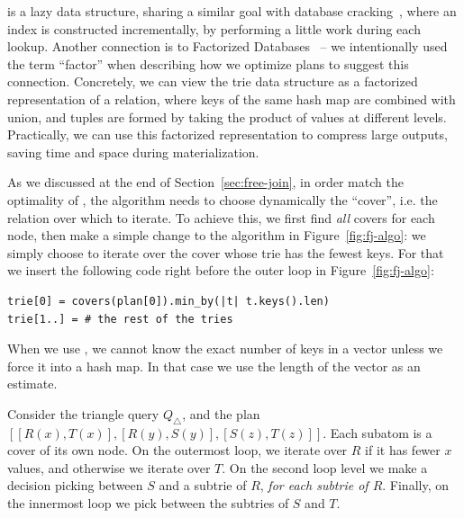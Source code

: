 \COLT is a lazy data structure, sharing a similar goal with database
cracking~\cite{DBLP:conf/cidr/IdreosKM07,DBLP:conf/sigmod/IdreosKM07}, where an
index is constructed incrementally, by performing a little work during each
lookup. 
Another connection is to Factorized Databases~\cite{DBLP:journals/sigmod/OlteanuS16} -- we
intentionally used the term ``factor'' when describing how we optimize \FJ plans to
suggest this connection. 
Concretely, we can view the trie data structure as a
factorized representation of a relation, where keys of the same hash map are
combined with union, and tuples are formed by taking the product of values at
different levels. Practically, we can use this factorized representation to 
compress large outputs, saving time and space during materialization.

As we discussed at the end of Section~\ref{sec:free-join}, in order
match the optimality of \GJ, the \FJ algorithm needs to choose
dynamically the ``cover'', i.e. the relation over which to iterate.  To
achieve this, we first find {\em all} covers for each node, then make a simple
change to the \FJ algorithm in Figure~\ref{fig:fj-algo}: we simply
choose to iterate over the cover whose trie has the fewest keys.  For
that we insert the following code right before the outer loop in
Figure~\ref{fig:fj-algo}:
%
\begin{lstlisting}
trie[0] = covers(plan[0]).min_by(|t| t.keys().len)
trie[1..] = # the rest of the tries
\end{lstlisting}
%
When we use \COLTs, we cannot know the exact number of keys in a vector unless
  we force it into a hash map. In that case we use the length of the vector as
  an estimate.

\begin{example}
  Consider the triangle query $Q_\triangle$, and the \FJ plan
  $[[R(x), T(x)], [R(y), S(y)], [S(z), T(z)]]$.  Each subatom is a
  cover of its own node.  On the outermost loop, we iterate over $R$
  if it has fewer $x$ values, and otherwise we iterate over $T$.  On
  the second loop level we make a decision picking between $S$ and a
  subtrie of $R$, \emph{for each subtrie of $R$}.  Finally, on the
  innermost loop we pick between the subtries of $S$ and $T$.
\end{example}

